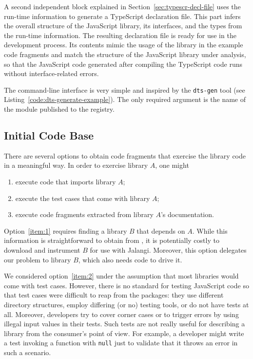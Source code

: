 \documentclass[sigplan,screen]{acmart}
\newcommand{\coderef}[1]{Listing~\ref{#1}}
\begin{document}
A second independent block explained in
Section~\ref{sec:typescr-decl-file} uses the run-time information to
generate a TypeScript declaration file. This part infers the overall
structure of the JavaScript library, its interfaces, and the types
from the run-time information.  The resulting declaration file is
ready for use in the development process. Its contents mimic the usage
of the library in the example code fragments and match the structure
of the JavaScript library under analysis, so that the JavaScript code
generated after compiling the TypeScript code runs without
interface-related errors.

The command-line interface is very simple and inspired by the \texttt{dts-gen} tool
\cite{dts-gen} (see \coderef{code:dts-generate-example}). The only required
argument is the name of the module published to the \NPM{} registry. 

\subsection{Initial Code Base}
\label{sec:initial-code-base}


There are several options to obtain code fragments that exercise the
library code in a meaningful way. In order to exercise library $A$,
one might
\begin{enumerate}
\item\label{item:1} execute code that imports library $A$;
\item\label{item:2} execute the test cases that come with library $A$;
\item\label{item:3} execute code fragments extracted from library $A$'s documentation.
\end{enumerate}

Option~\ref{item:1} requires finding a library $B$ that depends on
$A$. While this information is straightforward to obtain from \NPM, it
is potentially costly to download and instrument $B$ for use with
Jalangi. Moreover, this option delegates our problem
to library $B$, which also needs code to drive it. 

We considered option~\ref{item:2} under the assumption that most
libraries would come with test cases. However, there is no standard
for testing JavaScript code so that test cases were difficult to reap
from the \NPM{} packages: they use different directory structures,
employ differing (or no) testing tools, or do not have tests
at all. Moreover, developers try to cover corner cases or to trigger errors by using illegal
input values in their tests. Such tests are not really useful for describing a library
from the consumer's point of view. For example, a developer might write a test invoking a
function with \texttt{null} just to validate that it throws an error
in such a scenario. 
\end{document}
